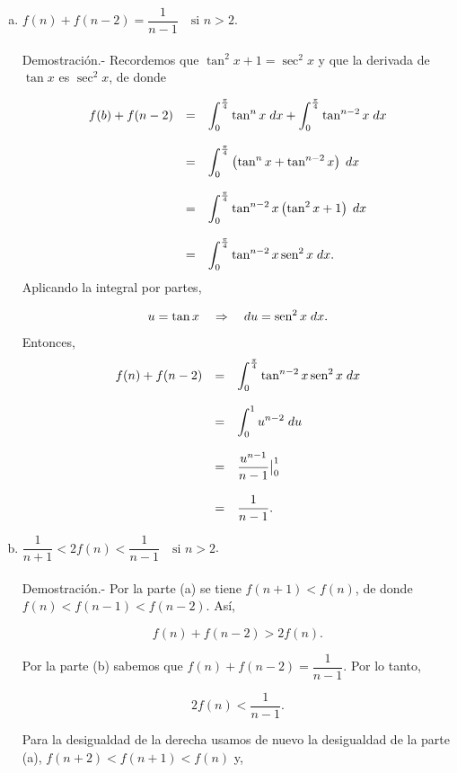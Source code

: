\begin{enumerate}[\bfseries 1.]
\begin{enumerate}[(a)]
	\item $f(n)+f(n-2)=\dfrac{1}{n-1}\quad \mbox{si } n>2$.\\\\
	    Demostración.-\; Recordemos que $\tan^2x+1=\sec^2x$ y que la derivada de $\tan x$ es $\sec^2 x$, de donde

	    $$
	    \begin{array}{rcl}
		f(b)+f(n-2) &=& \displaystyle\int_0^{\frac{\pi}{4}} \tan^n x\; dx + \int_0^{\frac{\pi}{4}} \tan^{n-2}x\; dx\\\\
			    &=& \displaystyle\int_0^{\frac{\pi}{4}}\left(\tan^n x+\tan^{n-2}x\right)\; dx\\\\
			    &=& \displaystyle\int_0^{\frac{\pi}{4}}\tan^{n-2}x\left(\tan^2 x + 1\right)\; dx\\\\
			    &=& \displaystyle\int_0^{\frac{\pi}{4}} \tan^{n-2} x\mathop{\mbox{\normalfont sen}}\nolimits^2 x\; dx.
	    \end{array}
	    $$
	    Aplicando la integral por partes,

	    $$u=\tan x\quad \Rightarrow \quad du=\mathop{\mbox{\normalfont sen}}\nolimits^2 x\; dx.$$

	    Entonces,
	    $$
	    \begin{array}{rcl}
		f(n)+f(n-2) &=& \displaystyle\int_0^{\frac{\pi}{4}} \tan^{n-2}x\mathop{\mbox{\normalfont sen}}\nolimits^2x\; dx\\\\
			    &=& \displaystyle\int_0^{1} u^{n-2}\; du\\\\
			    &=& \dfrac{u^{n-1}}{n-1}\big|_0^1\\\\
			    &=& \dfrac{1}{n-1}.
	    \end{array}
	    $$
	    \vspace{.5cm}

	\item $\dfrac{1}{n+1}<2f(n)<\dfrac{1}{n-1}\quad \mbox{si } n>2$.\\\\
	    Demostración.-\; Por la parte (a) se tiene $f(n+1)<f(n)$, de donde $f(n)<f(n-1)<f(n-2)$. Así,

	    $$f(n)+f(n-2)>2f(n).$$

	    Por la parte (b) sabemos que $f(n)+f(n-2)=\dfrac{1}{n-1}$. Por lo tanto,

	    $$2f(n)<\dfrac{1}{n-1}.$$

	    Para la desigualdad de la derecha usamos de nuevo la desigualdad de la parte (a), $f(n+2)<f(n+1)<f(n)$ y,


\end{enumerate}
\end{enumerate}
